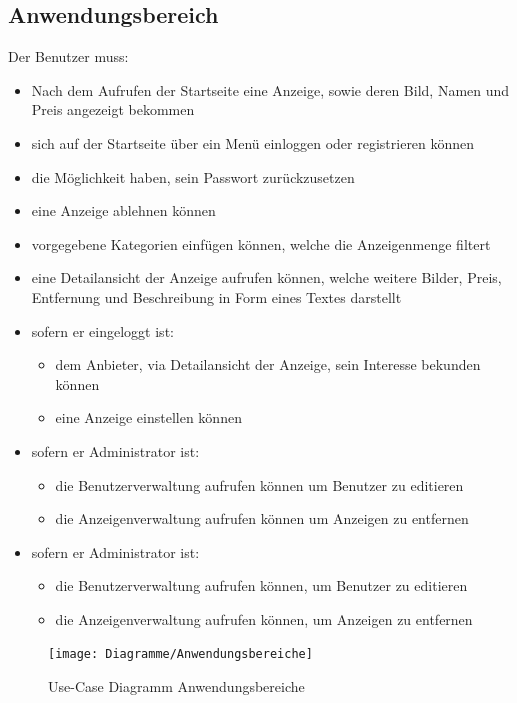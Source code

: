\documentclass[a4paper,12pt,oneside]{scrartcl}
\begin{document}
\subsection{Anwendungsbereich}
Der Benutzer muss:
\begin{itemize}
	\item Nach dem Aufrufen der Startseite eine Anzeige, sowie deren Bild, Namen und Preis angezeigt bekommen
	\item sich auf der Startseite über ein Menü einloggen oder registrieren können
	\item die Möglichkeit haben, sein Passwort zurückzusetzen
	\item eine Anzeige ablehnen können
	\item vorgegebene Kategorien einfügen können, welche die Anzeigenmenge filtert
	\item eine Detailansicht der Anzeige aufrufen können, welche weitere Bilder, Preis, Entfernung und Beschreibung in Form eines Textes darstellt

	\item sofern er eingeloggt ist:
	\begin{itemize}
		\item dem Anbieter, via Detailansicht der Anzeige, sein Interesse bekunden können
		\item eine Anzeige einstellen können
	\end{itemize}

	\item sofern er Administrator ist:
	\begin{itemize}
		\item die Benutzerverwaltung aufrufen können um Benutzer zu editieren
		\item die Anzeigenverwaltung aufrufen können um Anzeigen zu entfernen
	\end{itemize}
	
	\item sofern er Administrator ist:
	\begin{itemize}
		\item die Benutzerverwaltung aufrufen können, um Benutzer zu editieren
		\item die Anzeigenverwaltung aufrufen können, um Anzeigen zu entfernen
 	\end{itemize}
\end{itemize}

\begin{figure}[!htbp]
\centering
\noindent\texttt{[image: Diagramme/Anwendungsbereiche]}
\caption{Use-Case Diagramm Anwendungsbereiche}
\end{figure}
\FloatBarrier
\end{document}
